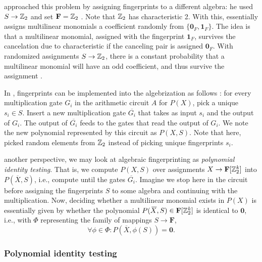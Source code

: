 \citeauthor{Koutis08} approached this problem by assigning fingerprints to a 
different algebra: he used $S \to \mathbb Z_2$ and set 
$\mathbf{F} = \mathbb Z_2$ \cite{Koutis08}. Note that $\mathbb Z_2$ has characteristic 2. With this, 
\citeauthor{Koutis08} essentially assigns multilinear monomials a coefficient 
randomly from $\{\mathbf{0}_F, \mathbf{1}_F\}$. The idea is that a multilinear monomial, 
assigned with the fingerprint $\mathbf{1}_F$,  
survives the cancelation due to characteristic if the canceling pair is assigned $\mathbf{0}_F$. 
With randomized assignments $S \to \mathbb Z_2$, there is a constant probability 
that a multilinear 
monomial will have an odd coefficient, and thus survive the assignment \cite{Koutis08}.

In , fingerprints can be implemented into the algebrization as follows \cite{Williams09}: 
for every multiplication gate $G_i$ in the arithmetic circuit $A$ for $P(X)$, 
pick a unique $s_i \in S$. Insert a new multiplication gate $\overbar{G_i}$ that takes 
as input $s_i$ and the output of $G_i$. The output of $\overbar{G_i}$ feeds to the 
gates that read the output of $G_i$. We note the new polynomial represented by this circuit 
as $P(X, S)$. Note that here, 
\citeauthor{Koutis08} picked random elements from $\mathbb Z_2$ 
instead of picking unique fingerprints $s_i$.

 another perspective, we may look at algebraic fingerprinting as \emph{polynomial identity testing}. 
That is, we compute $P(X, S)$ over assignments $X \to \mathbf{F}[\mathbb Z_2^k]$ into $P(\overbar{X}, S)$, i.e., 
compute until the gates $\overbar{G_i}$. 
Imagine we stop here in the circuit before assigning the fingerprints $S$ to some algebra 
and continuing with the multiplication. 
Now, deciding whether a multilinear monomial exists in $P(X)$ is essentially given by 
whether the polynomial $P(\,\overline{\!{X}}, S) \in \mathbf{F}[\mathbb Z_2^k]$ is identical to $\mathbf{0}$, 
i.e., with $\Phi$ representing the family of mappings $S \to \mathbf{F}$, 
\[
  \forall \phi \in \Phi %
  \colon P(\overbar{X}, \phi(S)) = \mathbf{0}.
\]

\subsubsection{Polynomial identity testing}


